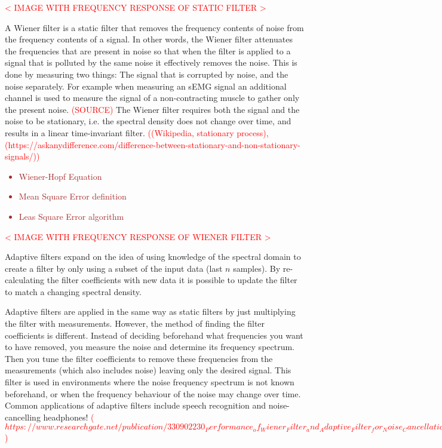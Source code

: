 \textcolor{red}{< IMAGE WITH FREQUENCY RESPONSE OF STATIC FILTER > }

A Wiener filter is a static filter that removes the frequency contents of noise from the frequency contents of a signal. In other words, the Wiener filter attenuates the frequencies that are present in noise so that when the filter is applied to a signal that is polluted by the same noise it effectively removes the noise. This is done by measuring two things: The signal that is corrupted by noise, and the noise separately. For example when measuring an sEMG signal an additional channel is used to measure the signal of a non-contracting muscle to gather only the present noise. \textcolor{red}{(SOURCE)}
The Wiener filter requires both the signal and the noise to be stationary, i.e. the spectral density does not change over time, and results in a linear time-invariant filter. \textcolor{red}{((Wikipedia, stationary process), (https://askanydifference.com/difference-between-stationary-and-non-stationary-signals/))}
\textcolor{brown}{\begin{itemize}
    \item Wiener-Hopf Equation
    \item Mean Square Error definition
    \item Leas Square Error algorithm
\end{itemize}}

\textcolor{red}{< IMAGE WITH FREQUENCY RESPONSE OF WIENER FILTER > }

Adaptive filters expand on the idea of using knowledge of the spectral domain to create a filter by only using a subset of the input data (last $n$ samples). By re-calculating the filter coefficients with new data it is possible to update the filter to match a changing spectral density. 

Adaptive filters are applied in the same way as static filters by just multiplying the filter with measurements. However, the  method of finding the filter coefficients is different. Instead of deciding beforehand what frequencies you want to have removed, you measure the noise and determine its frequency spectrum. Then you tune the filter coefficients to remove these frequencies from the measurements (which also includes noise) leaving only the desired signal. This filter is used in environments where the noise frequency spectrum is not known beforehand, or when the frequency behaviour of the noise may change over time. Common applications of adaptive filters include speech recognition and noise-cancelling headphones!
\textcolor{red}{($https://www.researchgate.net/publication/330902230_Performance_of_Wiener_Filter_and_Adaptive_Filter_for_Noise_Cancellation_in_Real-Time_Environment$)}

